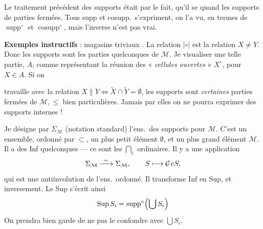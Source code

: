 \documentclass[11pt,a4paper]{article}
\begin{document}

Le traitement précédent des supports était  par le fait, qu'il se   \add{\ill{}} quand les supports de parties fermées. Tous supp et cosupp.\ s'expriment, on l'a vu, en termes de $\operatorname{supp}^{\circ}$ et $\operatorname{cosupp}^{\circ}$, mais l'inverse n'est pas vrai.

\textbf{Exemples instructifs} : magasins triviaux . La relation $|\circ|$ est la relation $X \neq Y$. Donc les supports sont les parties quelconques de $\mathcal{M}$. Je  visualiser une telle partie, $A$, comme représentant la réunion des « \emph{cellules ouvertes} » $X^{\circ}$, pour $X \in A$. Si on

travaille avec la relation $X \parallel Y \Longleftrightarrow \widetilde{X} \cap \widetilde{Y} = \emptyset$, les supports sont \emph{certaines} parties fermées de $\mathcal{M}, \leq$ bien particulières. Jamais par elles on ne pourra exprimer des supports internes !

Je désigne par $\Sigma_{\mathcal{M}}$ (notation standard) l'ens.\ des supports pour $\mathcal{M}$.  C'est un ensemble, \struck{\ill{}} ordonné par $\subset$,  un plus petit élément $\emptyset$, et un plus grand élément $\mathcal{M}$. Il a des Inf quelconques --- ce sont les $\bigcap_i$ ordinaires. Il y a une  application 
\[
  \Sigma_{\mathcal{M}} \xrightarrow{\ \sim\ } \Sigma_{\mathcal{M}}, \qquad S \longmapsto \text{\struck{$\mathcal{C}$}}\, \mathrm{c}S,
\]
qui est une antiinvolution de l'ens.\ ordonné. Il \struck{\ill{}} transforme   Inf en Sup, et inversement. Le Sup s'écrit ainsi
\[
  \operatorname{Sup} S_i = \operatorname{supp}^{\circ}\Bigl(\bigcup S_i\Bigr)
\]
On prendra bien garde de ne pas le confondre avec $\bigcup S_i$.
\end{document}
